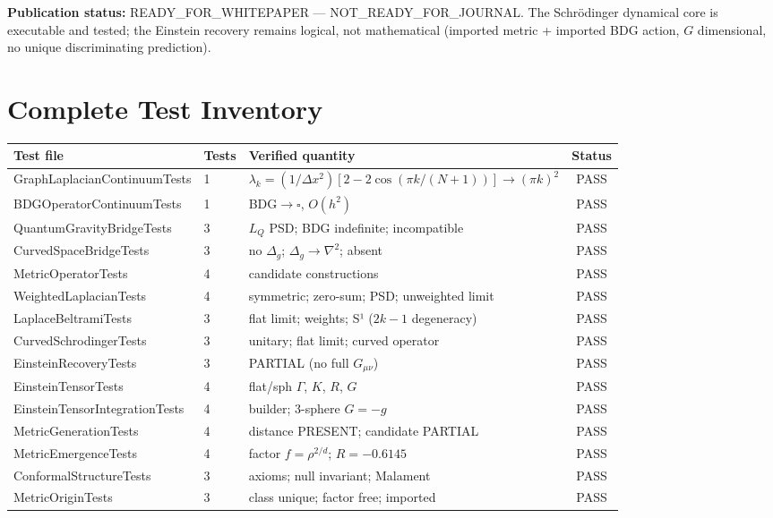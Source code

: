 \documentclass[11pt,twoside]{book}
\begin{document}
\textbf{Publication status:} READY\_FOR\_WHITEPAPER — NOT\_READY\_FOR\_JOURNAL. The
Schr\"odinger dynamical core is executable and tested; the Einstein recovery remains
logical, not mathematical (imported metric + imported BDG action, $G$ dimensional, no
unique discriminating prediction).

\appendix

\chapter{Complete Test Inventory}
\label{app:tests}

\begin{longtable}{lllc}
\toprule
Test file & Tests & Verified quantity & Status \\
\midrule
\endhead
GraphLaplacianContinuumTests & 1 & $\lambda_k=(1/\Delta x^2)[2-2\cos(\pi k/(N{+}1))]\to(\pi k)^2$ & PASS \\
BDGOperatorContinuumTests & 1 & BDG$\to\square$, $O(h^2)$ & PASS \\
QuantumGravityBridgeTests & 3 & $L_Q$ PSD; BDG indefinite; incompatible & PASS \\
CurvedSpaceBridgeTests & 3 & no $\Delta_g$; $\Delta_g\to\nabla^2$; absent & PASS \\
MetricOperatorTests & 4 & candidate constructions & PASS \\
WeightedLaplacianTests & 4 & symmetric; zero-sum; PSD; unweighted limit & PASS \\
LaplaceBeltramiTests & 3 & flat limit; weights; S¹ ($2k{-}1$ degeneracy) & PASS \\
CurvedSchrodingerTests & 3 & unitary; flat limit; curved operator & PASS \\
EinsteinRecoveryTests & 3 & PARTIAL (no full $G_{\mu\nu}$) & PASS \\
EinsteinTensorTests & 4 & flat/sph $\Gamma$, $K$, $R$, $G$ & PASS \\
EinsteinTensorIntegrationTests & 4 & builder; 3-sphere $G=-g$ & PASS \\
MetricGenerationTests & 4 & distance PRESENT; candidate PARTIAL & PASS \\
MetricEmergenceTests & 4 & factor $f=\rho^{2/d}$; $R=-0.6145$ & PASS \\
ConformalStructureTests & 3 & axioms; null invariant; Malament & PASS \\
MetricOriginTests & 3 & class unique; factor free; imported & PASS \\
\bottomrule
\end{longtable}
\end{document}
